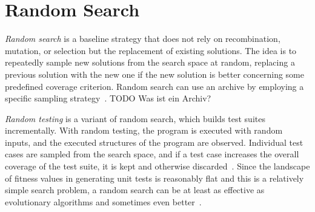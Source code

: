 \documentclass[paper=a4,%
  twoside,%
  BCOR4mm,%
  abstract=true,%
  toc=bibliography,%
  chapterprefix=true,%
  toc=bibliographynumbered,%
  open=right,%
  english,%
  pagesize=pdftex]{scrreprt}
\begin{document}
\section{Random Search}
\emph{Random search} is a baseline strategy that does not rely on recombination, mutation, or selection but the replacement of existing solutions. The idea is to repeatedly sample new solutions from the search space at random, replacing a previous solution with the new one if the new solution is better concerning some predefined coverage criterion. Random search can use an archive by employing a specific sampling strategy~\cite{Campos2017}. TODO Was ist ein Archiv?

\emph{Random testing} is a variant of random search, which builds test suites incrementally. With random testing, the program is executed with random inputs, and the executed structures of the program are observed. Individual test cases are sampled from the search space, and if a test case increases the overall coverage of the test suite, it is kept and otherwise discarded~\cite{Campos2017}. Since the landscape of fitness values in generating unit tests is reasonably flat and this is a relatively simple search problem, a random search can be at least as effective as evolutionary algorithms and sometimes even better~\cite{Shamshiri2015a}.
\end{document}
